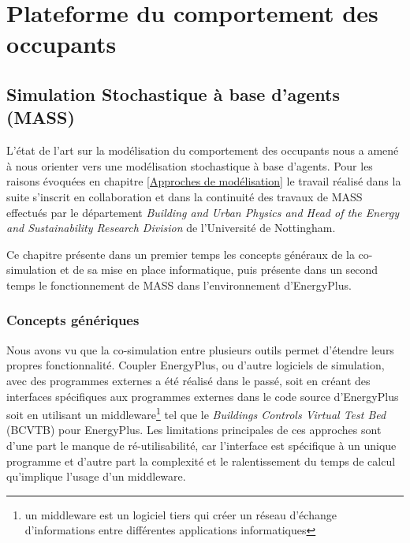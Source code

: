 \part{Plateforme du comportement des occupants}

\chapter{Simulation Stochastique à base d'agents (MASS)}
\label{MASS}

L'état de l'art sur la modélisation du comportement des occupants nous a amené à nous orienter vers une modélisation stochastique à base d'agents. Pour les raisons évoquées en chapitre \ref{Approches de modélisation} le travail réalisé dans la suite s'inscrit en collaboration et dans la continuité des travaux de MASS effectués par le département \textit{Building and Urban Physics and Head of the Energy and Sustainability Research Division} de l'Université de Nottingham. 

Ce chapitre présente dans un premier temps les concepts généraux de la co-simulation et de sa mise en place informatique, puis présente dans un second temps le fonctionnement de MASS dans l'environnement d'EnergyPlus.

\section{Concepts génériques}

Nous avons vu que la co-simulation entre plusieurs outils permet d'étendre leurs propres fonctionnalité. Coupler EnergyPlus, ou d'autre logiciels de simulation, avec des programmes externes a été réalisé dans le passé, soit en créant des interfaces spécifiques aux programmes externes dans le code source d'EnergyPlus \cite{Huang-99} soit en utilisant un middleware\footnote{un middleware est un logiciel tiers qui créer un réseau d'échange d'informations entre différentes applications informatiques} tel que le \textit{Buildings Controls Virtual Test Bed} (BCVTB) \cite{Wetter-11} \cite{Langevin-14} pour EnergyPlus. Les limitations principales de ces approches sont d'une part le manque de ré-utilisabilité, car l'interface est spécifique à un unique programme et d'autre part la complexité et le ralentissement du temps de calcul qu'implique l'usage d'un middleware.


